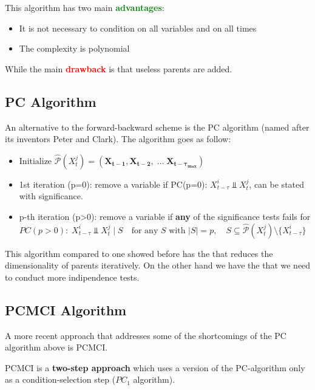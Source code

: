 This algorithm has two main \textbf{\textcolor{Green}{advantages}}:
\begin{itemize}
    \item It is not necessary to condition on all variables and on all times
    \item The complexity is polynomial
\end{itemize}
While the main \textbf{\textcolor{Red}{drawback}} is that useless parents are added.

\subsection{PC Algorithm}
An alternative to the forward-backward scheme is the PC algorithm (named after its inventors Peter and Clark).
The algorithm goes as follow:
\begin{itemize}
    \item Initialize $\hat{\mathcal{P}}(X^j_t)=(\bm{X_{t-1}}, \bm{X_{t-2}},\;\ldots\;\bm{X_{t-\tau_{max}}})$
    \item 1st iteration (p=0): remove a variable if PC(p=0): $X^i_{t-\tau}\Perp X^j_{t}$, can be stated with significance.
    \item p-th iteration (p>0): remove a variable if \textbf{any} of the significance tests fails for \\
    $PC(p > 0):\;X^i_{t-\tau}\Perp X^j_{t}\;|\;S\quad \text{for any } S \text{ with } |S|=p,\quad S\subseteq\hat{\mathcal{P}}(X^j_t)\setminus\{X^i_{t-\tau}\}$
\end{itemize}
This algorithm compared to one showed before has the \advantage that reduces the dimensionality of parents iteratively.
On the other hand we have the \drawback that we need to conduct more indipendence tests.

\subsection{PCMCI Algorithm}
A more recent approach that addresses some of the shortcomings of the PC algorithm above is PCMCI.

PCMCI is a \textbf{two-step approach} which uses a version of the PC-algorithm only as a condition-selection step ($PC_1$ algorithm).\\

